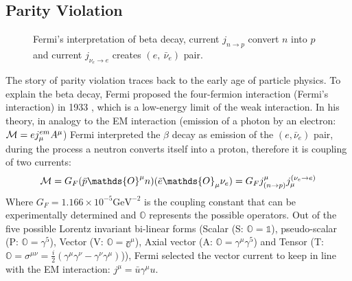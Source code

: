 \subsection{Parity Violation}
\begin{figure}[!h]
    \centering
    \caption{Fermi's interpretation of beta decay, current $j_{n \rightarrow p}$ 
    convert $n$ into $p$ and current $j_{\nu_e \rightarrow e}$ creates $(e, \ \bar{\nu}_e) $
    pair.}
\end{figure}
The story of parity violation traces back to the early age of particle physics. 
To explain the beta decay, Fermi proposed the four-fermion interaction 
(Fermi's interaction) in 1933 \cite{Fermi1934}, which is a low-energy limit of the 
weak interaction. In his theory, in analogy to the EM interaction (emission of a
photon by an electron: $\mathcal{M} = ej_\mu^{em} A^\mu$) Fermi interpreted the $\beta$
decay as emission of the $(e, \bar{\nu}_e)$ pair, during the process a neutron converts
itself into a proton, therefore it is coupling of two currents:
\begin{equation}
    \CM = G_F (\bar{p} \mathds{O}^\mu n)(\bar{e} \mathds{O}_\mu \nu_e) 
	= G_F j^\mu_{(n\rightarrow p)} j_\mu^{(\nu_e\rightarrow e)}
\end{equation}
Where $G_F = 1.166 \times 10^{-5} \mathrm{GeV}^{-2}$ is the coupling constant that 
can be experimentally determined and $\mathds{O}$ represents 
the possible operators. Out of the five possible Lorentz invariant bi-linear forms 
(Scalar (S: $\mathds{O} = \mathds{1}$), pseudo-scalar (P: $\mathds{O} = \gamma^5$), 
Vector (V: $\mathds{O} = \mathds{\gamma^\mu}$), Axial vector (A: $\mathds{O} = \gamma^\mu\gamma^5$) 
and Tensor (T: $\mathds{O}=\sigma^{\mu\nu} = \frac{i}{2}(\gamma^\mu\gamma^\nu - \gamma^\nu\gamma^\mu)$)),
Fermi selected the vector current to keep in line with the EM interaction:
$j^\mu = \bar{u} \gamma^\mu u$.


